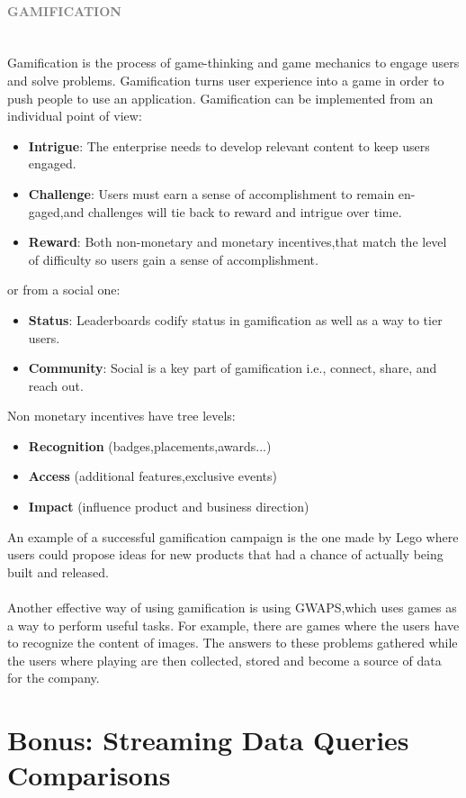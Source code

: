 \documentclass[10pt,a4paper]{article}
\newcommand{\nline}{\\~\\}
\newcommand{\myparagraph}[1]{\paragraph{\normalsize{\textcolor{gray}{\uppercase{\textbf{#1}}}} }\mbox{} \vspace{0.5em}\\}
\begin{document}
\myparagraph{Gamification}
Gamification is the process of game-thinking and game mechanics to engage users and solve problems. Gamification turns user experience into a game in order to push people to use an application.
Gamification can be implemented from an individual point of view:
\begin{itemize}
	\item \textbf{Intrigue}: The enterprise needs to develop relevant content to keep users engaged.
	\item \textbf{Challenge}: Users must earn a sense of accomplishment to remain en- gaged,and challenges will tie back to reward and intrigue over time.
	\item \textbf{Reward}: Both non-monetary and monetary incentives,that match the level of difficulty so users gain a sense of accomplishment.
\end{itemize}
or from a social one:
\begin{itemize}
	\item \textbf{Status}: Leaderboards codify status in gamification as well as a way to tier users.
	\item \textbf{Community}: Social is a key part of gamification i.e., connect, share, and reach out.
\end{itemize}
Non monetary incentives have tree levels:
\begin{itemize}
	\item \textbf{Recognition} (badges,placements,awards...)
	\item \textbf{Access} (additional features,exclusive events)
	\item \textbf{Impact} (influence product and business direction)
\end{itemize}
An example of a successful gamification campaign is the one made by Lego where users could propose ideas for new products that had a chance of actually being built and released. \nline
Another effective way of using gamification is using GWAPS,which uses games as a way to perform useful tasks. For example, there are games where the users have to recognize the content of images. The answers to these problems gathered while the users where playing are then collected, stored and become a source of data for the company.

\pagebreak

\section{Bonus: Streaming Data Queries Comparisons}
\end{document}
